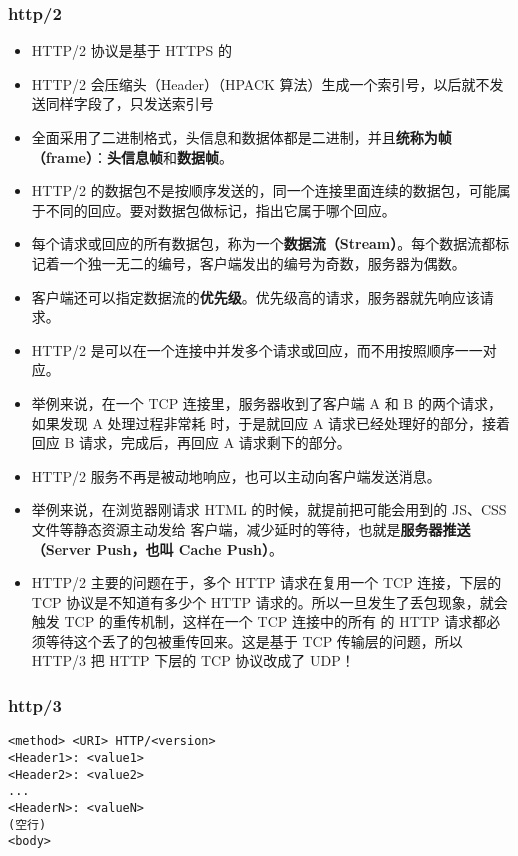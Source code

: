 \subsubsection{http/2}
\begin{itemize}
\item HTTP/2 协议是基于 HTTPS 的
\item HTTP/2 会压缩头（Header）（HPACK 算法）生成一个索引号，以后就不发送同样字段了，只发送索引号
\item 全面采用了二进制格式，头信息和数据体都是二进制，并且\textbf{统称为帧（frame）}：\textbf{头信息帧}和\textbf{数据帧}。
\item HTTP/2 的数据包不是按顺序发送的，同一个连接里面连续的数据包，可能属于不同的回应。要对数据包做标记，指出它属于哪个回应。
\item 每个请求或回应的所有数据包，称为一个\textbf{数据流（Stream）}。每个数据流都标记着一个独一无二的编号，客户端发出的编号为奇数，服务器为偶数。
\item 客户端还可以指定数据流的\textbf{优先级}。优先级高的请求，服务器就先响应该请求。
\item HTTP/2 是可以在一个连接中并发多个请求或回应，而不用按照顺序一一对应。
\item 举例来说，在一个 TCP 连接里，服务器收到了客户端 A 和 B 的两个请求，如果发现 A 处理过程非常耗 时，于是就回应 A 请求已经处理好的部分，接着回应 B 请求，完成后，再回应 A 请求剩下的部分。
\item HTTP/2 服务不再是被动地响应，也可以主动向客户端发送消息。
\item 举例来说，在浏览器刚请求 HTML 的时候，就提前把可能会用到的 JS、CSS 文件等静态资源主动发给 客户端，减少延时的等待，也就是\textbf{服务器推送（Server Push，也叫 Cache Push）}。
\item HTTP/2 主要的问题在于，多个 HTTP 请求在复用一个 TCP 连接，下层的 TCP 协议是不知道有多少个 HTTP 请求的。所以一旦发生了丢包现象，就会触发 TCP 的重传机制，这样在一个 TCP 连接中的所有 的 HTTP 请求都必须等待这个丢了的包被重传回来。这是基于 TCP 传输层的问题，所以  HTTP/3 把 HTTP 下层的 TCP 协议改成了 UDP！
\end{itemize}

\subsubsection{http/3}


\begin{lstlisting}[language=none]
<method> <URI> HTTP/<version>
<Header1>: <value1>
<Header2>: <value2>
...
<HeaderN>: <valueN>
(空行)
<body>
\end{lstlisting}

